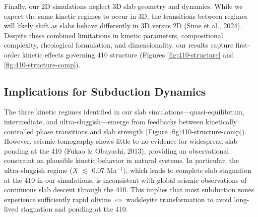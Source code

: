 \documentclass[draft,linenumbers]{agujournal2019}
\begin{document}
Finally, our 2D simulations neglect 3D slab geometry and dynamics. While
we expect the same kinetic regimes to occur in 3D, the transitions
between regimes will likely shift as slabs behave differently in 3D
versus 2D (Sime et al., 2024). Despite these combined limitations in
kinetic parameters, compositional complexity, rheological formulation,
and dimensionality, our results capture first-order kinetic effects
governing 410 structure (Figures \ref{fig:410-structure} and
\ref{fig:410-structure-comp}).

\subsection{Implications for Subduction
Dynamics}\label{sec:implications-for-subduction-dynamics}

The three kinetic regimes identified in our slab
simulations---quasi-equilibrium, intermediate, and
ultra-sluggish---emerge from feedbacks between kinetically controlled
phase transitions and slab strength (Figure
\ref{fig:410-structure-comp}). However, seismic tomography shows little
to no evidence for widespread slab ponding at the 410 (Fukao \&
Obayashi, 2013), providing an observational constraint on plausible
kinetic behavior in natural systems. In particular, the ultra-sluggish
regime (\(\dot{X}\) \(\lesssim\) 0.07 Ma\(^{-1}\)), which leads to
complete slab stagnation at the 410 in our simulations, is inconsistent
with global seismic observations of continuous slab descent through the
410. This implies that most subduction zones experience sufficiently
rapid olivine \(\Leftrightarrow\) wadsleyite transformation to avoid
long-lived stagnation and ponding at the 410.
\end{document}
